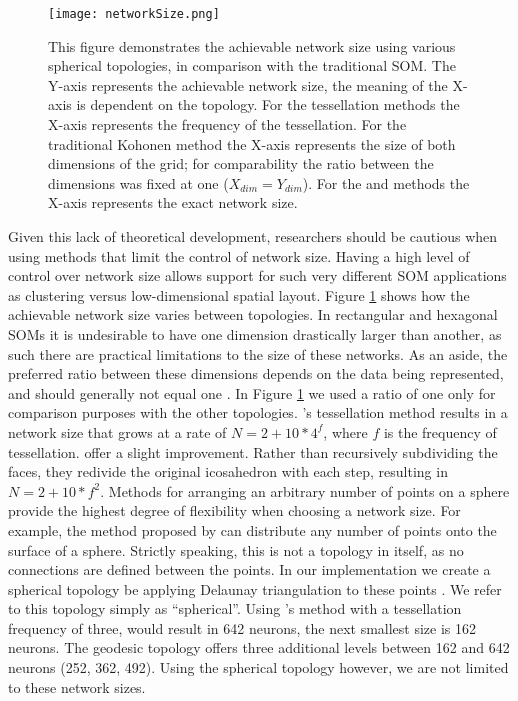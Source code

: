 \begin{figure}[htb]
\centering
\texttt{[image: networkSize.png]}
\caption{This figure demonstrates the achievable network size using various
spherical topologies, in comparison with the traditional SOM. The Y-axis
represents the achievable network size, the meaning of the X-axis is dependent
on the topology. For the tessellation methods the X-axis represents the
frequency of the tessellation. For the traditional Kohonen method the X-axis
represents the size of both dimensions of the grid; for comparability the
ratio between the dimensions was fixed at one ($X_{dim}=Y_{dim}$).  For the
\cite{Rakhmanov94} and \cite{Nishio:2006fk} methods the X-axis represents the
exact network size.}
\label{fig:nSize}
\end{figure}

Given this lack of theoretical development, researchers should be cautious
when using methods that limit the control of network size.  Having a high
level of control over network size allows support for such very different SOM
applications as clustering versus low-dimensional spatial layout.
Figure \ref{fig:nSize} shows how the achievable network size varies between
topologies.  In rectangular and hexagonal SOMs it is undesirable to have one dimension
drastically larger than another, as such there are practical limitations to
the size of these networks.  As an aside, the preferred ratio between these
dimensions depends on the data being represented, and should generally not
equal one \citep{kohonen1996, toolbox}.  In Figure \ref{fig:nSize} we used a
ratio of one only for comparison purposes with the other topologies.
\citeauthor{ritter99}'s tessellation method results in a network size that
grows at a rate of \(N=2+10*4^f\), where $f$ is the frequency of tessellation.
\cite{wu2006} offer a slight improvement. Rather than recursively subdividing
the faces, they redivide the original icosahedron with each step, resulting in
\(N=2+10*f^2\).  Methods for arranging an arbitrary number of points on a
sphere provide the highest degree of flexibility when choosing a network
size.  For example, the method proposed by \cite{Rakhmanov94} can
distribute any number of points onto the surface of a sphere.  Strictly
speaking, this is not a topology in itself, as no connections are defined
between the points. In our implementation we create a spherical topology be
applying Delaunay triangulation to these points \citep{Ranka97}.  We refer to
this topology simply as ``spherical''. Using \citeauthor{ritter99}'s method
with a tessellation frequency of three, would result in 642 neurons, the next
smallest size is 162 neurons.  The geodesic topology offers three additional
levels between 162 and 642 neurons (252, 362, 492).  Using the spherical
topology however, we are not limited to these network sizes.

